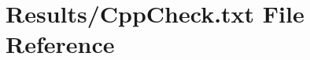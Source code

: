 \hypertarget{CppCheck_8txt}{}\section{Results/\+Cpp\+Check.txt File Reference}
\label{CppCheck_8txt}
